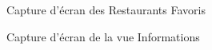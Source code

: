\begin{figure}[H]
    \label{fig-favoris}
    \noindent{}
    \caption{Capture d'écran des Restaurants Favoris}

\end{figure}

\begin{figure}[H]
    \label{fig-infos}
    \noindent{}
    \caption{Capture d'écran de la vue Informations}
\end{figure}

